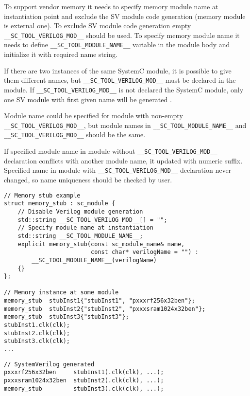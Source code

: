 To support vendor memory it needs to specify memory module name at instantiation point and exclude the SV module code generation (memory module is external one). To exclude SV module code generation empty {\tt \_\_SC\_TOOL\_VERILOG\_MOD\_\_} should be used. To specify memory module name it needs to define {\tt \_\_SC\_TOOL\_MODULE\_NAME\_\_} variable in the module body and initialize it with required name string.

If there are two instances of the same SystemC module, it is possible to give them different names, but {\tt \_\_SC\_TOOL\_VERILOG\_MOD\_\_} must be declared in the module. If {\tt \_\_SC\_TOOL\_VERILOG\_MOD\_\_} is not declared the SystemC module, only one SV module with first given name will be generated . 

Module name could be specified for module with non-empty {\tt \_\_SC\_TOOL\_VERILOG\_MOD\_\_}, but module names in {\tt \_\_SC\_TOOL\_MODULE\_NAME\_\_} and {\tt \_\_SC\_TOOL\_VERILOG\_MOD\_\_} should be the same.

If specified module name in module without {\tt \_\_SC\_TOOL\_VERILOG\_MOD\_\_} declaration conflicts with another module name, it updated with numeric suffix. Specified name in module with {\tt \_\_SC\_TOOL\_VERILOG\_MOD\_\_}  declaration never changed, so name uniqueness should be checked by user.

\begin{lstlisting}[style=mycpp]
// Memory stub example
struct memory_stub : sc_module {
    // Disable Verilog module generation
    std::string __SC_TOOL_VERILOG_MOD__[] = "";  
    // Specify module name at instantiation
    std::string __SC_TOOL_MODULE_NAME__;             
    explicit memory_stub(const sc_module_name& name,
                         const char* verilogName = "") :
        __SC_TOOL_MODULE_NAME__(verilogName)
    {}
};

// Memory instance at some module
memory_stub  stubInst1{"stubInst1", "pxxxrf256x32ben"};
memory_stub  stubInst2{"stubInst2", "pxxxsram1024x32ben"};
memory_stub  stubInst3{"stubInst3"};
stubInst1.clk(clk); 
stubInst2.clk(clk); 
stubInst3.clk(clk); 
...
\end{lstlisting}
%
\begin{lstlisting}[style=mycpp]
// SystemVerilog generated 
pxxxrf256x32ben     stubInst1(.clk(clk), ...);
pxxxsram1024x32ben  stubInst2(.clk(clk), ...);
memory_stub         stubInst3(.clk(clk), ...);
\end{lstlisting}


